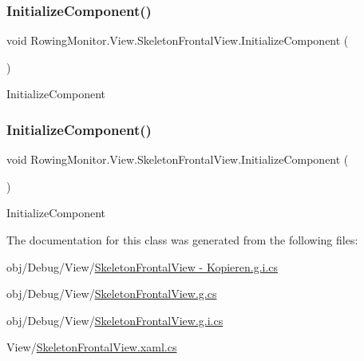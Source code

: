 \subsubsection{\texorpdfstring{Initialize\+Component()}{InitializeComponent()}\hspace{0.1cm}{\footnotesize\ttfamily [4/5]}}
{\footnotesize\ttfamily void Rowing\+Monitor.\+View.\+Skeleton\+Frontal\+View.\+Initialize\+Component (\begin{DoxyParamCaption}{ }\end{DoxyParamCaption})}



Initialize\+Component 

\mbox{\label{class_rowing_monitor_1_1_view_1_1_skeleton_frontal_view_a47e693425fedb725291469b158ff9625}} 
\subsubsection{\texorpdfstring{Initialize\+Component()}{InitializeComponent()}\hspace{0.1cm}{\footnotesize\ttfamily [5/5]}}
{\footnotesize\ttfamily void Rowing\+Monitor.\+View.\+Skeleton\+Frontal\+View.\+Initialize\+Component (\begin{DoxyParamCaption}{ }\end{DoxyParamCaption})}



Initialize\+Component 



The documentation for this class was generated from the following files\+:\begin{DoxyCompactItemize}
\item 
obj/\+Debug/\+View/\hyperlink{_skeleton_frontal_view_01-_01_kopieren_8g_8i_8cs}{Skeleton\+Frontal\+View -\/ Kopieren.\+g.\+i.\+cs}\item 
obj/\+Debug/\+View/\hyperlink{_debug_2_view_2_skeleton_frontal_view_8g_8cs}{Skeleton\+Frontal\+View.\+g.\+cs}\item 
obj/\+Debug/\+View/\hyperlink{_debug_2_view_2_skeleton_frontal_view_8g_8i_8cs}{Skeleton\+Frontal\+View.\+g.\+i.\+cs}\item 
View/\hyperlink{_skeleton_frontal_view_8xaml_8cs}{Skeleton\+Frontal\+View.\+xaml.\+cs}\end{DoxyCompactItemize}
